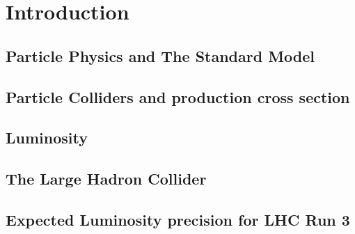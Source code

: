 \chapter{Introduction}
\label{ch1}


\section{Particle Physics and The Standard Model}


\section{Particle Colliders and production cross section}


\section{Luminosity }



\section{The Large Hadron Collider}
 


\section{Expected Luminosity precision for LHC Run 3}


